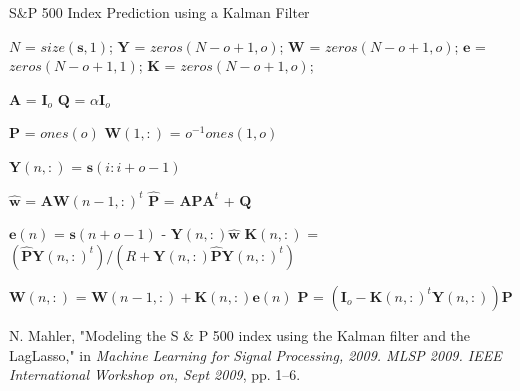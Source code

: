 \documentclass[11pt, fleqn]{article}
\begin{document}
\begin{algorithm}[H]
\caption{S\&P 500 Index Prediction using a Kalman Filter}
\label{alg:kalman}
\begin{algorithmic}

 

\State

\State $N$ = $size(\bm{s}, 1)$; 
\State $\bm{Y}$ = $zeros(N - o + 1, o)$; 
\State $\bm{W}$ = $zeros(N - o + 1, o)$; 
\State $\bm{e}$ = $zeros(N - o + 1, 1)$; 
\State $\bm{K}$ = $zeros(N - o + 1, o)$; 

\State

\State $\bm{A}$ = $\bm{I}_o$ 
\State $\bm{Q}$ = $\alpha\bm{I}_o$ 

\State

\State $\bm{P}$ = $ones(o)$ 
\State $\bm{W}(1,:)$ = $o^{-1}ones(1,o)$

\State


	\State $\bm{Y}(n, :)$ = $\bm{s}(i:i+o-1)$ 

	\State

	\State $\hat{\bm{w}}$ = $\bm{A}\bm{W}(n-1, :)^t$ 
	\State $\hat{\bm{P}}$ = $\bm{A}\bm{P}\bm{A}^t$ + $\bm{Q}$ 

	\State
	
	\State $\bm{e}(n)$ = $\bm{s}(n+o-1)$ - $\bm{Y}(n, :)\hat{\bm{w}}$ 
	\State $\bm{K}(n,:)$ = $(\hat{\bm{P}}\bm{Y}(n, :)^t)/(R + \bm{Y}(n, :)\hat{\bm{P}}\bm{Y}(n, :)^t)$ 

	\State

	\State $\bm{W}(n, :)$ = $\bm{W}(n-1, :) + \bm{K}(n,:)\bm{e}(n)$ 
	\State $\bm{P}$ = $(\bm{I}_o - \bm{K}(n,:)^t\bm{Y}(n, :))\bm{P}$ 

\EndFor

\EndProcedure
\end{algorithmic}
\end{algorithm}

\begin{thebibliography}{9}
N. Mahler, "Modeling the S \& P 500 index using the Kalman filter and the LagLasso," in \textit{Machine Learning for Signal Processing, 2009. MLSP 2009. IEEE International Workshop on, Sept 2009}, pp. 1–6.

\end{thebibliography}
\end{document}
